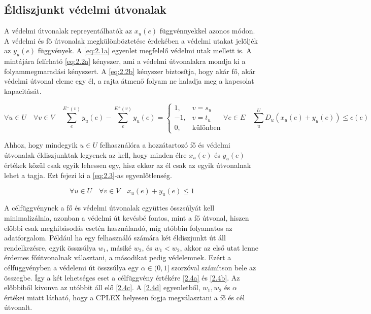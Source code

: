 \documentclass[a4paper,oneside]{article}
\newcommand{\inedge}[1]{E^-(#1)}
\newcommand{\outedge}[1]{E^+(#1)}
\begin{document}
\subsection{Éldiszjunkt védelmi útvonalak}
\label{sec:edgedisjunct}

A védelmi útvonalak repreyentálhatók az $x_u(e)$ függvénnyekkel azonos módon.
A védelmi és fő útvonalak megkülönböztetése érdekében a védelmi utakat jelöljék az $y_u(e)$ függvények.
A \eqref{eq:2.1a} egyenlet megfelelő védelmi utak mellett is.
A mintájára felírható \eqref{eq:2.2a} kényszer,
ami a védelmi útvonalakra mondja ki a folyammegmaradási kényszert.
A \eqref{eq:2.2b} kényszer biztosítja, hogy akár fő, akár védelmi útvonal eleme egy él,
a rajta átmenő folyam ne haladja meg a kapcsolat kapacitását.

\begin{subequations}
  \begin{equation}
    \forall u \in U \quad \forall v \in V \quad \sum_{e}^{\inedge{v}}y_u(e) - \sum_{e}^{\outedge{v}}y_u(e) = \begin{cases}
      1, & v = s_u \\
      -1, & v = t_u\\
      0, & \text{különben}
    \end{cases} \label{eq:2.2a}
  \end{equation}
  \begin{equation}
    \forall e \in E \quad \sum_{u}^{U} D_u \left( x_u(e) + y_u(e) \right) \leq c(e) \label{eq:2.2b}
  \end{equation}
\end{subequations}

\newpage

Ahhoz, hogy mindegyik $u \in U$ felhasználóra a hozzátartozó fő és védelmi útvonalak éldiszjunktak legyenek az kell,
hogy minden élre $x_u(e)$ és $y_u(e)$ értékek közül csak egyik lehessen egy,
hisz ekkor az él csak az egyik útvonalnak lehet a tagja. Ezt fejezi ki a \eqref{eq:2.3}-as egyenlőtlenség.

\begin{equation}
  \forall u \in U \quad \forall v \in V \quad x_u(e) + y_u(e) \leq 1 \label{eq:2.3}
\end{equation}

A célfüggvénynek a fő és védelmi útvonalak együttes összsúlyát kell minimalizálnia,
azonban a védelmi út kevésbé fontos, mint a fő útvonal, hiszen előbbi csak meghibásodás esetén
használandó, míg utóbbin folyamatos az adatforgalom.
Például ha egy felhasználó számára két éldiszjunkt út áll rendelkezésre, egyik összsúlya $w_1$, másiké $w_2$,
és $w_1 < w_2$, akkor az első utat lenne érdemes főútvonalnak választani, a másodikat pedig védelemnek.
Ezért a célfüggvényben a védelemi út összsúlya egy $\alpha \in (0, 1]$ szorzóval számítson bele az összegbe.
Így a két lehetséges eset a célfüggvény értékére \eqref{2.4a} és \eqref{2.4b}.
Az előbbiből kivonva az utóbbit áll elő \eqref{2.4c}.
A \eqref{2.4d} egyenletből, $w_1, w_2$ és $\alpha$ értékei miatt látható,
hogy a CPLEX helyesen fogja megválasztani a fő és cél útvonalt.
\end{document}
